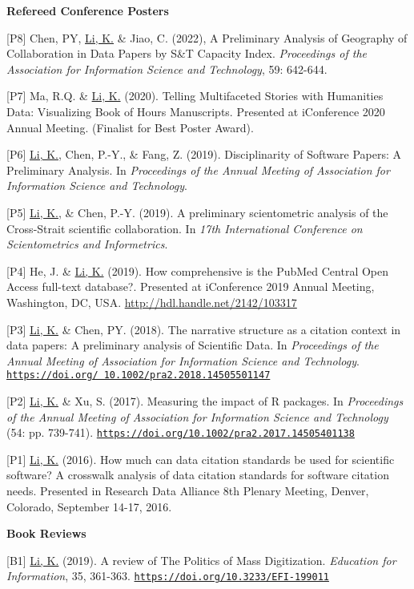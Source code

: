 \documentclass[margin, 10pt]{res} %
\begin{document}
\begin{resume}
\textbf{Refereed Conference Posters}

[P8] Chen, PY, \underline{Li, K.} \& Jiao, C. (2022), A Preliminary Analysis of Geography of Collaboration in Data Papers by S\&T Capacity Index. \textit{Proceedings of the Association for Information Science and Technology}, 59: 642-644.

[P7] Ma, R.Q. \& \underline{Li, K.} (2020). Telling Multifaceted Stories with Humanities Data: Visualizing Book of Hours Manuscripts. Presented at iConference 2020 Annual Meeting. (Finalist for Best Poster Award).

[P6] \underline{Li, K.}, Chen, P.-Y., \& Fang, Z. (2019). Disciplinarity of Software Papers: A Preliminary Analysis. In \textit{Proceedings of the Annual Meeting of Association for Information Science and Technology}.

[P5] \underline{Li, K.}, \& Chen, P.-Y. (2019). A preliminary scientometric analysis of the Cross-Strait scientific collaboration. In \textit{17th International Conference on Scientometrics and Informetrics}.

[P4] He, J. \& \underline{Li, K.} (2019). How comprehensive is the PubMed Central Open Access full-text database?. Presented at iConference 2019 Annual Meeting, Washington, DC, USA. \href{http://hdl.handle.net/2142/103317}{http://hdl.handle.net/2142/103317}

[P3] \underline{Li, K.} \& Chen, PY. (2018). The narrative structure as a citation context in data papers: A preliminary analysis of Scientific Data. In \textit{Proceedings of the Annual Meeting of Association for Information Science and Technology}. \href{https://doi.org/10.1002/pra2.2018.14505501147}{\nolinkurl{https://doi.org/ 10.1002/pra2.2018.14505501147}}

[P2] \underline{Li, K.} \& Xu, S. (2017). Measuring the impact of R packages. In \textit{Proceedings of the Annual Meeting of Association for Information Science and Technology} (54: pp. 739-741). \href{https://doi.org/10.1002/pra2.2017.14505401138}{\nolinkurl{https://doi.org/10.1002/pra2.2017.14505401138}}

[P1] \underline{Li, K.} (2016). How much can data citation standards be used for scientific software? A crosswalk analysis of data citation standards for software citation needs. Presented in Research Data Alliance 8th Plenary Meeting, Denver, Colorado, September 14-17, 2016.

\textbf{Book Reviews}

[B1] \underline{Li, K.} (2019). A review of The Politics of Mass Digitization. \textit{Education for Information}, 35, 361-363. \href{https://doi.org/10.3233/EFI-199011}{\nolinkurl{https://doi.org/10.3233/EFI-199011}}


\end{resume}
\end{document}
